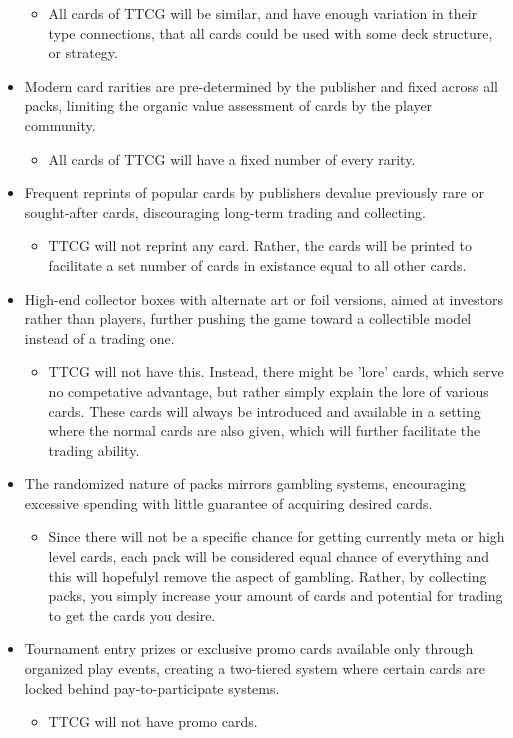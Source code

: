 \begin{itemize}
 	\begin{itemize}
		\item All cards of TTCG will be similar, and have enough variation in their type connections, that all cards could be used with some deck structure, or strategy.
  	\end{itemize}
   	\item Modern card rarities are pre-determined by the publisher and fixed across all packs, limiting the organic value assessment of cards by the player community.
 	\begin{itemize}
		\item All cards of TTCG will have a fixed number of every rarity.
  	\end{itemize}
    	\item Frequent reprints of popular cards by publishers devalue previously rare or sought-after cards, discouraging long-term trading and collecting.
 	\begin{itemize}
		\item TTCG will not reprint any card. Rather, the cards will be printed to facilitate a set number of cards in existance equal to all other cards.
  	\end{itemize}
     	\item High-end collector boxes with alternate art or foil versions, aimed at investors rather than players, further pushing the game toward a collectible model instead of a trading one.
 	\begin{itemize}
		\item TTCG will not have this. Instead, there might be 'lore' cards, which serve no competative advantage, but rather simply explain the lore of various cards. These cards will always be introduced and available in a setting where the normal cards are also given, which will further facilitate the trading ability.
  	\end{itemize}
      	\item The randomized nature of packs mirrors gambling systems, encouraging excessive spending with little guarantee of acquiring desired cards.
 	\begin{itemize}
		\item Since there will not be a specific chance for getting currently meta or high level cards, each pack will be considered equal chance of everything and this will hopefulyl remove the aspect of gambling. Rather, by collecting packs, you simply increase your amount of cards and potential for trading to get the cards you desire.
  	\end{itemize}
        \item Tournament entry prizes or exclusive promo cards available only through organized play events, creating a two-tiered system where certain cards are locked behind pay-to-participate systems. 	
	\begin{itemize}
		\item TTCG will not have promo cards.
  	\end{itemize}
\end{itemize}












